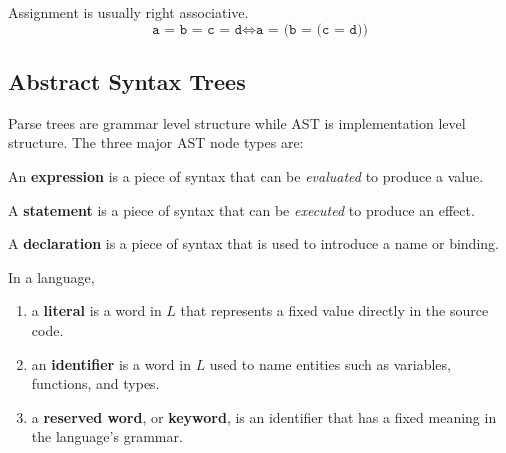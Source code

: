   \begin{example}[Assignment]
    \label{ex:assignment}
    Assignment is usually right associative. 
    \begin{equation}
      \texttt{a = b = c = d} \iff \texttt{a = (b = (c = d))}
    \end{equation}
  \end{example}

\subsection{Abstract Syntax Trees}

  Parse trees are grammar level structure while AST is implementation level structure. The three major AST node types are: 

  \begin{definition}[Expression]
    \label{def:expression}
    An \textbf{expression} is a piece of syntax that can be \textit{evaluated} to produce a value. 
  \end{definition}

  \begin{definition}[Statement]
    \label{def:statement}
    A \textbf{statement} is a piece of syntax that can be \textit{executed} to produce an effect.
  \end{definition}

  \begin{definition}[Declaration]
    \label{def:declaration}
    A \textbf{declaration} is a piece of syntax that is used to introduce a name or binding. 
  \end{definition}

  \begin{definition}
    \label{def:categories-of-words}
    In a language, 
    \begin{enumerate}
      \item a \textbf{literal} is a word in $L$ that represents a fixed value directly in the source code. 
      \item an \textbf{identifier} is a word in $L$ used to name entities such as variables, functions, and types. 
      \item a \textbf{reserved word}, or \textbf{keyword}, is an identifier that has a fixed meaning in the language's grammar. 
    \end{enumerate}
  \end{definition}

